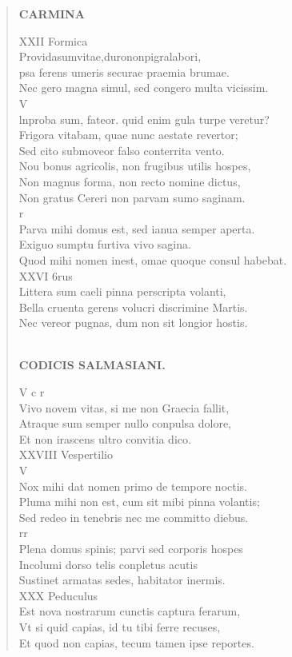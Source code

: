 \documentclass[11pt, a4paper]{report}
\begin{document}
\begin{verse}
     \marginpar{[228]} \begin{center} \textbf{CARMINA} \end{center}XXII Formica \\ Providasumvitae,durononpigralabori, \\ psa ferens umeris securae praemia brumae. \\ Nec gero magna simul, sed congero multa vicissim. \\ V \\ lnproba sum, fateor. quid enim gula turpe veretur? \\ Frigora vitabam, quae nunc aestate revertor; \\ Sed cito submoveor falso conterrita vento. \\ Nou bonus agricolis, non frugibus utilis hospes, \\ Non magnus forma, non recto nomine dictus, \\ Non gratus Cereri non parvam sumo saginam. \\ r \\ Parva mihi domus est, sed ianua semper aperta. \\ Exiguo sumptu furtiva vivo sagina. \\ Quod mihi nomen inest, omae quoque consul habebat. \\ XXVI 6rus \\ Littera sum caeli pinna perscripta volanti, \\ Bella cruenta gerens volucri discrimine Martis. \\ Nec vereor pugnas, dum non sit longior hostis. \\ 
        ﻿\pagebreak 
     \marginpar{[229]} \begin{center} \textbf{CODICIS SALMASIANI.} \end{center}V c r \\ Vivo novem vitas, si me non Graecia fallit, \\ Atraque sum semper nullo conpulsa dolore, \\ Et non irascens ultro convitia dico. \\ XXVIII Vespertilio \\ V \\ Nox mihi dat nomen primo de tempore noctis. \\ Pluma mihi non est, cum sit mibi pinna volantis; \\ Sed redeo in tenebris nec me committo diebus. \\ rr \\ Plena domus spinis; parvi sed corporis hospes \\ Incolumi dorso telis conpletus acutis \\ Sustinet armatas sedes, habitator inermis. \\ XXX Peduculus \\ Est nova nostrarum cunctis captura ferarum, \\ Vt si quid capias, id tu tibi ferre recuses, \\ Et quod non capias, tecum tamen ipse reportes. \\ 

\end{verse}
\end{document}
